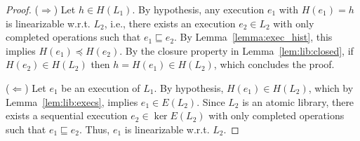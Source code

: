 \begin{proof}

($\Rightarrow$) Let $h\in H(L_1)$. By hypothesis, any execution $e_1$ with $H(e_1)=h$ is linearizable w.r.t. $L_2$, i.e.,
there exists an execution $e_2\in L_2$ with only completed operations 
such that $e_1\sqsubseteq e_2$. By Lemma~\ref{lemma:exec_hist}, this implies $H(e_1)\preceq H(e_2)$.
By the closure property in Lemma~\ref{lem:lib:closed}, if $H(e_2)\in H(L_2)$
then $h=H(e_1)\in H(L_2)$, which concludes the proof.

($\Leftarrow$) Let $e_1$ be an execution of $L_1$. By hypothesis, $H(e_1)\in H(L_2)$, which by Lemma~\ref{lem:lib:execs},
implies $e_1\in E(L_2)$.
Since $L_2$ is an atomic library, %
there exists a sequential execution $e_2\in \ker E(L_2)$ with only completed operations 
such that $e_1\sqsubseteq e_2$. Thus, $e_1$ is linearizable w.r.t. $L_2$.
%
\end{proof}


%
%
%
